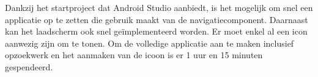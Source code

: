 Dankzij het startproject dat Android Studio aanbiedt, is het mogelijk om snel een applicatie op te zetten 
die gebruik maakt van de navigatiecomponent. Daarnaast kan het laadscherm ook snel geïmplementeerd worden. 
Er moet enkel al een icon aanwezig zijn om te tonen. Om de volledige applicatie aan te maken inclusief opzoekwerk
en het aanmaken van de icoon
is er 1 uur en 15 minuten gespendeerd.

